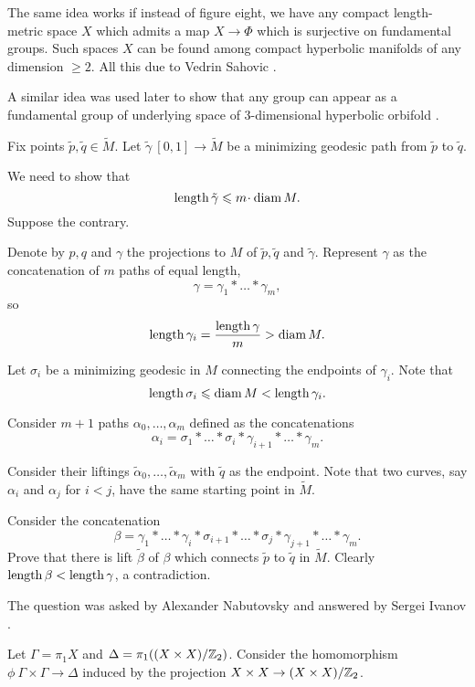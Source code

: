 The same idea works if instead of figure eight, we have any compact length-metric space $X$ which admits a map $X\to\Phi$
which is surjective on fundamental groups.
Such spaces $X$ can be found among compact hyperbolic manifolds of any dimension $\ge 2$.
All this due to Vedrin Sahovic \cite[see][]{sahovic}.

A similar idea was used later to show that any group can appear as a fundamental group of underlying space of 3-dimensional hyperbolic orbifold \cite[see][]{panov-petrunin-telescopic}.





Fix points $\tilde p,\tilde q\in\tilde M$.
Let  
$\tilde\gamma\:[0,1]\to \tilde M$ be a minimizing geodesic path from $\tilde p$ to $\tilde q$. 

We need to show that 
\[\length \tilde\gamma\le m\cdot \diam M.\]
Suppose the contrary.

Denote by $p,q$ and $\gamma$ the projections to $M$ of $\tilde p,\tilde q$ and $\tilde \gamma$. 
Represent $\gamma$
as the concatenation of $m$ paths of equal length,
\[\gamma=\gamma_1{*}\dots{*}\gamma_m,\] 
so
\[\operatorname{\rm length}\gamma_i=\frac{\operatorname{\rm length}\gamma}m>\operatorname{\rm diam} M.\] 

Let $\sigma_i$ be a minimizing geodesic in $M$ connecting the endpoints of $\gamma_i$. 
Note that 
\[\operatorname{\rm length}\sigma_i\leqslant \operatorname{\rm diam} M< \operatorname{\rm length}\gamma_i.\] 

Consider $m+1$ paths $\alpha_0,\dots,\alpha_m$ defined as the concatenations 
\[\alpha_i=\sigma_1{*}\dots{*}\sigma_i{*}\gamma_{i+1}{*}\dots{*}\gamma_m.\]

Consider their liftings $\tilde\alpha_0,\dots,\tilde\alpha_m$ 
with $\tilde q$ as the endpoint.
Note that two curves, say $\alpha_i$ and $\alpha_j$ for $i<j$, 
have the same starting point in $\tilde M$.

Consider the concatenation
\[\beta=\gamma_1{*}\dots{*}\gamma_i{*}\sigma_{i+1}{*}\dots{*}\sigma_j{*}\gamma_{j+1}{*}\dots{*}\gamma_m.\]
Prove that there is lift $\tilde\beta$ of $\beta$ 
which connects $\tilde p$ to $\tilde q$ in $\tilde M$.
Clearly $\operatorname{\rm length} \beta<\operatorname{\rm length} \gamma$, a contradiction.
\qeds

The question was asked by Alexander  Nabutovsky
and answered by Sergei Ivanov \cite[see][]{ivanov}.



Let $\Gamma=\pi_1 X$ and $\Delta=\pi_1((X\times X)/\mathbb{Z}_2)$.
Consider the homomorphism $\phi\:\Gamma\times \Gamma\to \Delta$
induced by the projection $X\times X\to (X\times X)/\mathbb{Z}_2$.


